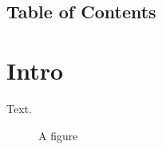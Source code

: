 \documentclass{memoir}
\begin{document}
\section*{Table of Contents}
\tableofcontents*
\listoffigures*
\chapter{Intro}
Text.
\begin{figure}\caption{A figure}\end{figure}
\end{document}
